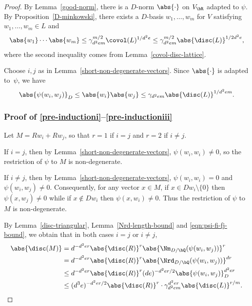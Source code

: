 \begin{proof}
By Lemma~\ref{good-norm}, there is a $D$-norm $\abs{\cdot}$ on $V_\bR$ adapted to $\psi$.
By Proposition~\ref{D-minkowski}, there exists a $D$-basis $w_1, \dotsc, w_m$ for $V$ satisfying $w_1, \dotsc, w_m \in L$ and\vspace*{-3pt}
\[
\abs{w_1} \dotsm \abs{w_m} \leq \gamma_{d^2em}^{m/2} \covol(L)^{1/d^2e} \leq \gamma_{d^2em}^{m/2} \abs{\disc(L)}^{1/2d^2e},
\]
where the second inequality comes from Lemma~\ref{covol-disc-lattice}.

Choose $i, j$ as in Lemma~\ref{short-non-degenerate-vectors}.
Since $\abs{\cdot}$ is adapted to~$\psi$, we have\vspace*{-3pt}
\begin{equation} \label{eqn:psi-fi-fj-bound}
\abs{\psi(w_i, w_j)}_D \leq \abs{w_i}\abs{w_j} \leq \gamma_{d^2em} \abs{\disc(L)}^{1/d^2em}.
\end{equation}

\subsubsection*{Proof of \eqref{pre-inductioni}--\eqref{pre-inductioniii}}

Let $M = Rw_i + Rw_j$, so that $r=1$ if $i=j$ and $r=2$ if $i \neq j$.

If $i=j$, then by Lemma~\ref{short-non-degenerate-vectors}, $\psi(w_i, w_i) \neq 0$, so the restriction of $\psi$ to $M$ is non-degenerate.

If $i \neq j$, then by Lemma~\ref{short-non-degenerate-vectors}, $\psi(w_i, w_i) = 0$ and $\psi(w_i, w_j) \neq 0$. Consequently, for any vector $x \in M$, if $x \in Dw_i \setminus \{0\}$ then $\psi(x, w_j) \neq 0$ while if $x \not\in Dw_i$ then $\psi(x, w_i) \neq 0$.
Thus the restriction of $\psi$ to $M$ is non-degenerate.

By Lemma~\ref{disc-triangular}, Lemma~\ref{Nrd-length-bound} and \eqref{eqn:psi-fi-fj-bound}, we obtain that in both cases $i=j$ or $i \neq j$,\vspace*{-3pt}
\begin{align*}
\abs{\disc(M)}
& = d^{-d^2er} \abs{\disc(R)}^r \abs{\Nm_{D/\bQ}(\psi(w_i, w_j))}^r
\\& = d^{-d^2er} \abs{\disc(R)}^r \abs{\Nrd_{D/\bQ}(\psi(w_i, w_j))}^{dr}
\\& \leq d^{-d^2er} \abs{\disc(R)}^r (de)^{-d^2er/2} \abs{\psi(w_i, w_j)}_D^{d^2er}
\\& \leq (d^3e)^{-d^2er/2} \abs{\disc(R)}^r \cdot \gamma_{d^2em}^{d^2er} \abs{\disc(L)}^{r/m}.
\end{align*}


\end{proof}
